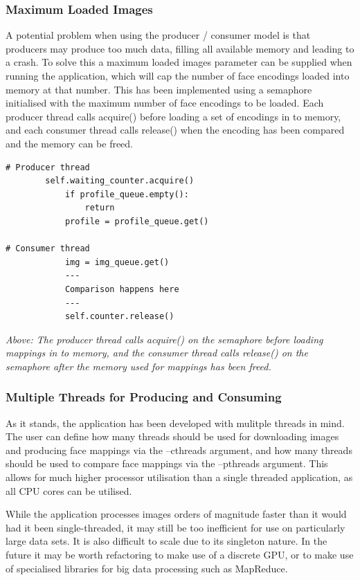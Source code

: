 \documentclass[12pt]{article}
\begin{document}
\subsubsection{Maximum Loaded Images}
A potential problem when using the producer / consumer model is that producers may produce too much data, filling all available memory and leading to a crash. To solve this a maximum loaded images parameter can be supplied when running the application, which will cap the number of face encodings loaded into memory at that number. This has been implemented using a semaphore initialised with the maximum number of face encodings to be loaded. Each producer thread calls acquire() before loading a set of encodings in to memory, and each consumer thread calls release() when the encoding has been compared and the memory can be freed.

\begin{lstlisting}
# Producer thread
		self.waiting_counter.acquire()
            if profile_queue.empty():
                return
            profile = profile_queue.get()
            
# Consumer thread
            img = img_queue.get()
            ---
            Comparison happens here
            ---
			self.counter.release()
\end{lstlisting}
\textit{Above: The producer thread calls acquire() on the semaphore before loading mappings in to memory, and the consumer thread calls release() on the semaphore after the memory used for mappings has been freed.}

\subsubsection{Multiple Threads for Producing and Consuming}
As it stands, the application has been developed with mulitple threads in mind. The user can define how many threads should be used for downloading images and producing face mappings via the --cthreads argument, and how many threads should be used to compare face mappings via the --pthreads argument. This allows for much higher processor utilisation than a single threaded application, as all CPU cores can be utilised.

While the application processes images orders of magnitude faster than it would had it been single-threaded, it may still be too inefficient for use on particularly large data sets. It is also difficult to scale due to its singleton nature. In the future it may be worth refactoring to make use of a discrete GPU, or to make use of specialised libraries for big data processing such as MapReduce.
\end{document}
